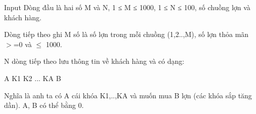 Input
Dòng đầu là hai số M và N, 1 ≤ M ≤ 1000, 1 ≤ N ≤ 100, số chuồng lợn và khách hàng.  

   Dòng tiếp theo ghi M số là số lợn trong mỗi chuồng (1,2..,M), số lợn thỏa mãn $>$=0 và  $\le$ 1000.  

   N dòng tiếp theo lưu thông tin về khách hàng và có dạng:  

   A K1 K2 ... KA B  

   Nghĩa là anh ta có A cái khóa K1,..,KA và muốn mua B lợn (các khóa sắp  tăng dần). A, B có thể bằng 0.